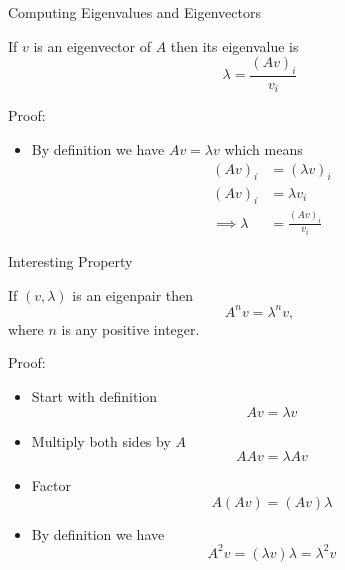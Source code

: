 \documentclass[10pt]{beamer}
\begin{document}
\begin{frame}{Computing Eigenvalues and Eigenvectors}

\begin{theorem}
    If $v$ is an eigenvector of $A$ then its eigenvalue is 
        $$ \lambda = \frac{(Av)_i}{v_i}$$
\end{theorem}
Proof:
\begin{itemize}
\item By definition we have $Av = \lambda v$ which means
\begin{align*}
    (Av)_i &= (\lambda v)_i \\
    (Av)_i &= \lambda v_i \\
    \implies \lambda &= \frac{(Av)_i}{v_i}
\end{align*}
\end{itemize}
\end{frame}


\begin{frame}{Interesting Property}

\begin{theorem}
    If $(v,\lambda)$ is an eigenpair then 
    $$A^nv = \lambda^n v, $$
    where $n$ is any positive integer.
\end{theorem}

    Proof: 
    \begin{itemize}
        \item Start with definition 
        $$A v = \lambda v$$
        \item Multiply both sides by $A$
        $$AAv  = \lambda A v $$
        \item Factor
         $$A(Av) = (Av)\lambda $$
         \item By definition we have 
         $$A^2 v = (\lambda v) \lambda = \lambda^2 v$$
    \end{itemize}
\end{frame}
\end{document}
